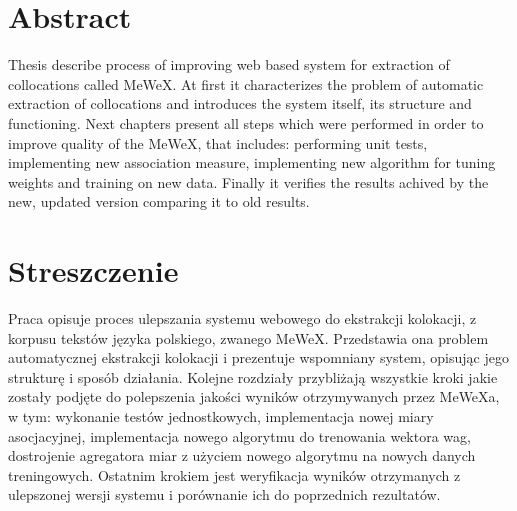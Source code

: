 \section*{Abstract}
Thesis describe process of improving web based system for extraction of
collocations called MeWeX. At first it characterizes the problem of automatic extraction of collocations 
and introduces the system itself, its structure and functioning. Next chapters present all steps 
which were performed in order to improve quality of the MeWeX, that includes: performing unit tests,
implementing new association measure, implementing new algorithm for tuning
weights and training on new data. Finally it verifies the results achived by the new, 
updated version comparing it to old results.

\vspace{5em}

\section*{Streszczenie}
Praca opisuje proces ulepszania systemu webowego do ekstrakcji kolokacji, z korpusu tekstów języka polskiego, zwanego MeWeX.
Przedstawia ona problem automatycznej ekstrakcji kolokacji i prezentuje wspomniany system, opisując jego strukturę i 
sposób działania. Kolejne rozdziały przybliżają wszystkie kroki jakie zostały podjęte do polepszenia jakości wyników 
otrzymywanych przez MeWeXa, w tym: wykonanie testów jednostkowych, implementacja nowej miary asocjacyjnej,
implementacja nowego algorytmu do trenowania wektora wag, dostrojenie agregatora miar z użyciem nowego algorytmu 
na nowych danych treningowych. Ostatnim krokiem jest weryfikacja wyników otrzymanych z ulepszonej wersji systemu 
i porównanie ich do poprzednich rezultatów.
